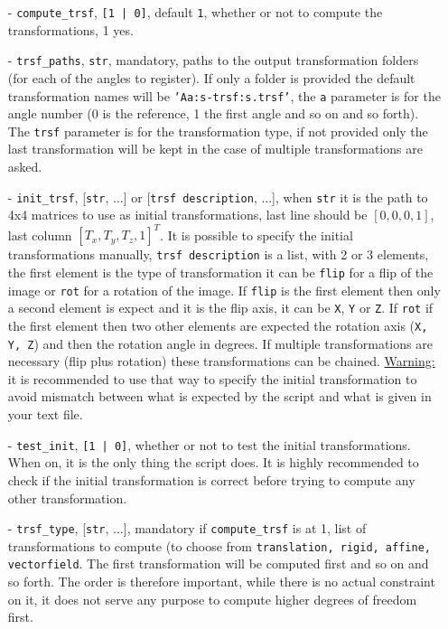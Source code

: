 \documentclass[10pt,a4paper]{book}
\begin{document}
\begin{enumerate}
\item[-] \texttt{compute\_trsf}, \texttt{[1 | 0]}, default \texttt{1}, whether or not to compute the transformations, 1 yes.
\item[-] \texttt{trsf\_paths}, \texttt{str}, mandatory, paths to the output transformation folders (for each of the angles to register). If only a folder is provided the default transformation names will be \texttt{'A{a:s}-{trsf:s}.trsf'}, the \texttt{a} parameter is for the angle number (0 is the reference, 1 the first angle and so on and so forth). The \texttt{trsf} parameter is for the transformation type, if not provided only the last transformation will be kept in the case of multiple transformations are asked.
\item[-] \texttt{init\_trsf}, [\texttt{str}, ...] or [\texttt{trsf description}, ...], when \texttt{str} it is the path to 4x4 matrices to use as initial transformations, last line should be $[0, 0, 0, 1]$, last column $[T_x, T_y, T_z,1]^T$. It is possible to specify the initial transformations manually, \texttt{trsf description} is a list, with 2 or 3 elements, the first element is the type of transformation it can be \texttt{flip} for a flip of the image or \texttt{rot} for a rotation of the image. If \texttt{flip} is the first element then only a second element is expect and it is the flip axis, it can be \texttt{X}, \texttt{Y} or \texttt{Z}. If \texttt{rot} if the first element then two other elements are expected the rotation axis (\texttt{X, Y, Z}) and then the rotation angle in degrees. If multiple transformations are necessary (flip plus rotation) these transformations can be chained. \underline{Warning:} it is recommended to use that way to specify the initial transformation to avoid mismatch between what is expected by the script and what is given in your text file.
\item[-] \texttt{test\_init}, \texttt{[1 | 0]}, whether or not to test the initial transformations. When on, it is the only thing the script does. It is highly recommended to check if the initial transformation is correct before trying to compute any other transformation.
\item[-] \texttt{trsf\_type}, [\texttt{str}, ...], mandatory if \texttt{compute\_trsf} is at 1, list of transformations to compute (to choose from \texttt{translation, rigid, affine, vectorfield}. The first transformation will be computed first and so on and so forth. The order is therefore important, while there is no actual constraint on it, it does not serve any purpose to compute higher degrees of freedom first.

\end{enumerate}
\end{document}
